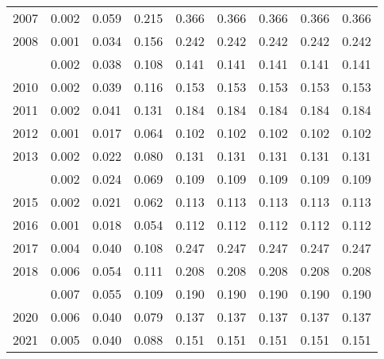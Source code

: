 \documentclass[
]{article}
\begin{document}
\begin{longtable}[t]{lrrrrrrrr}
2007 & 0.002 & 0.059 & 0.215 & 0.366 & 0.366 & 0.366 & 0.366 & 0.366\\
2008 & 0.001 & 0.034 & 0.156 & 0.242 & 0.242 & 0.242 & 0.242 & 0.242\\
\addlinespace
2009 & 0.002 & 0.038 & 0.108 & 0.141 & 0.141 & 0.141 & 0.141 & 0.141\\
2010 & 0.002 & 0.039 & 0.116 & 0.153 & 0.153 & 0.153 & 0.153 & 0.153\\
2011 & 0.002 & 0.041 & 0.131 & 0.184 & 0.184 & 0.184 & 0.184 & 0.184\\
2012 & 0.001 & 0.017 & 0.064 & 0.102 & 0.102 & 0.102 & 0.102 & 0.102\\
2013 & 0.002 & 0.022 & 0.080 & 0.131 & 0.131 & 0.131 & 0.131 & 0.131\\
\addlinespace
2014 & 0.002 & 0.024 & 0.069 & 0.109 & 0.109 & 0.109 & 0.109 & 0.109\\
2015 & 0.002 & 0.021 & 0.062 & 0.113 & 0.113 & 0.113 & 0.113 & 0.113\\
2016 & 0.001 & 0.018 & 0.054 & 0.112 & 0.112 & 0.112 & 0.112 & 0.112\\
2017 & 0.004 & 0.040 & 0.108 & 0.247 & 0.247 & 0.247 & 0.247 & 0.247\\
2018 & 0.006 & 0.054 & 0.111 & 0.208 & 0.208 & 0.208 & 0.208 & 0.208\\
\addlinespace
2019 & 0.007 & 0.055 & 0.109 & 0.190 & 0.190 & 0.190 & 0.190 & 0.190\\
2020 & 0.006 & 0.040 & 0.079 & 0.137 & 0.137 & 0.137 & 0.137 & 0.137\\
2021 & 0.005 & 0.040 & 0.088 & 0.151 & 0.151 & 0.151 & 0.151 & 0.151\\*
\end{longtable}
\end{document}
